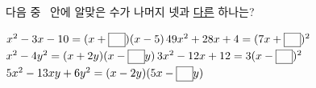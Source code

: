 다음 중 \blank\ 안에 알맞은 수가 나머지 넷과 \underline{다른} 하나는?
\begin{choicesv}{$x^2-3x-10=(x+\blank)(x-5)$}{$49x^2+28x+4=(7x+\blank)^2$}{$x^2-4y^2=(x+2y)(x-\blank y)$}{$3x^2-12x+12=3(x-\blank)^2$}{$5x^2-13xy+6y^2=(x-2y)(5x-\blank y)$}\end{choicesv}
